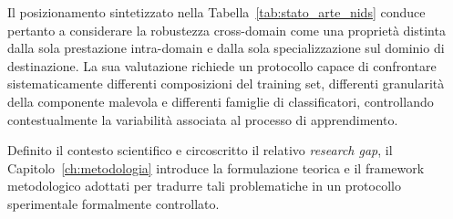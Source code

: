 Il posizionamento sintetizzato nella Tabella~\ref{tab:stato_arte_nids} conduce pertanto a considerare la robustezza cross-domain come una proprietà distinta dalla sola prestazione intra-domain e dalla sola specializzazione sul dominio di destinazione. 
La sua valutazione richiede un protocollo capace di confrontare sistematicamente differenti composizioni del training set, differenti granularità della componente malevola e differenti famiglie di classificatori, controllando contestualmente la variabilità associata al processo di apprendimento.

Definito il contesto scientifico e circoscritto il relativo \textit{research gap}, il Capitolo~\ref{ch:metodologia} introduce la formulazione teorica e il framework metodologico adottati per tradurre tali problematiche in un protocollo sperimentale formalmente controllato.
